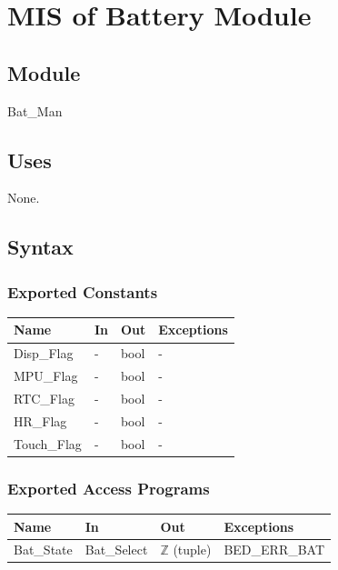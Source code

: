 \documentclass[12pt, titlepage]{article}
\begin{document}






\section{MIS of Battery Module} \label{mBM} 

\subsection{Module}

Bat\_Man

\subsection{Uses}

None.

\subsection{Syntax}

\subsubsection{Exported Constants}

\begin{center}
\begin{tabular}{p{2cm} p{4cm} p{3cm} p{4cm}}
\hline
\textbf{Name} & \textbf{In} & \textbf{Out} & \textbf{Exceptions} \\
\hline
Disp\_Flag& - & bool & - \\
MPU\_Flag& - & bool & - \\
RTC\_Flag& - & bool & - \\
HR\_Flag& - & bool & - \\
Touch\_Flag& - & bool & - \\
\hline
\end{tabular}
\end{center}

\subsubsection{Exported Access Programs}

\begin{center}
\begin{tabular}{p{2cm} p{4cm} p{3cm} p{4cm}}
\hline
\textbf{Name} & \textbf{In} & \textbf{Out} & \textbf{Exceptions} \\
\hline
Bat\_State & Bat\_Select & $\mathbb{Z}$ (tuple) & BED\_ERR\_BAT\\
\hline
\end{tabular}
\end{center}
\end{document}
